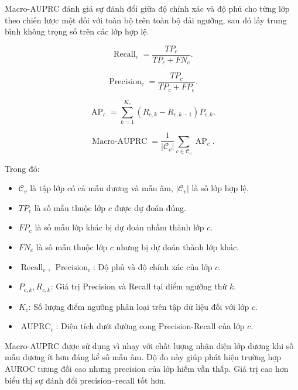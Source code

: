 Macro-AUPRC \cite{Davis2006PR} đánh giá sự đánh đổi giữa độ chính xác và độ phủ cho từng lớp theo chiến lược một đối với toàn bộ trên toàn bộ dải ngưỡng, sau đó lấy trung bình không trọng số trên các lớp hợp lệ.

\begin{equation}
    \operatorname{Recall}_{c} = \frac{TP_c}{TP_c + FN_c}.
    \label{eq:ch4_recall_def}
\end{equation}

\begin{equation}
    \operatorname{Precision}_{c} = \frac{TP_c}{TP_c + FP_c}.
    \label{eq:ch4_precision_def}
\end{equation}

\begin{equation}
    \operatorname{AP}_{c} = \sum_{k=1}^{K_c} \left(R_{c,k} - R_{c,k-1}\right) P_{c,k}.
    \label{eq:ch4_ap_class}
\end{equation}

\begin{equation}
    \operatorname{Macro\text{-}AUPRC}=\frac{1}{\left|\mathcal{C}_{v}\right|}\sum_{c\in\mathcal{C}_{v}}\operatorname{AP}_{c}.
    \label{eq:ch4_macro_auprc}
\end{equation}

Trong đó:
\begin{itemize}
    \item $\mathcal{C}_{v}$ là tập lớp có cả mẫu dương và mẫu âm, $|\mathcal{C}_{v}|$ là số lớp hợp lệ.
    \item $TP_c$ là số mẫu thuộc lớp $c$ được dự đoán đúng.
    \item $FP_c$ là số mẫu lớp khác bị dự đoán nhầm thành lớp $c$.
    \item $FN_c$ là số mẫu thuộc lớp $c$ nhưng bị dự đoán thành lớp khác.
    \item $\operatorname{Recall}_c$, $\operatorname{Precision}_c$: Độ phủ và độ chính xác của lớp $c$.
    \item $P_{c,k}, R_{c,k}$: Giá trị Precision và Recall tại điểm ngưỡng thứ $k$.
    \item $K_c$: Số lượng điểm ngưỡng phân loại trên tập dữ liệu đối với lớp $c$.
    \item $\operatorname{AUPRC}_c$: Diện tích dưới đường cong Precision-Recall của lớp $c$.
\end{itemize}

Macro-AUPRC được sử dụng vì nhạy với chất lượng nhận diện lớp dương khi số mẫu dương ít hơn đáng kể số mẫu âm. Độ đo này giúp phát hiện trường hợp AUROC tương đối cao nhưng precision của lớp hiếm vẫn thấp. Giá trị cao hơn biểu thị sự đánh đổi precision--recall tốt hơn.

